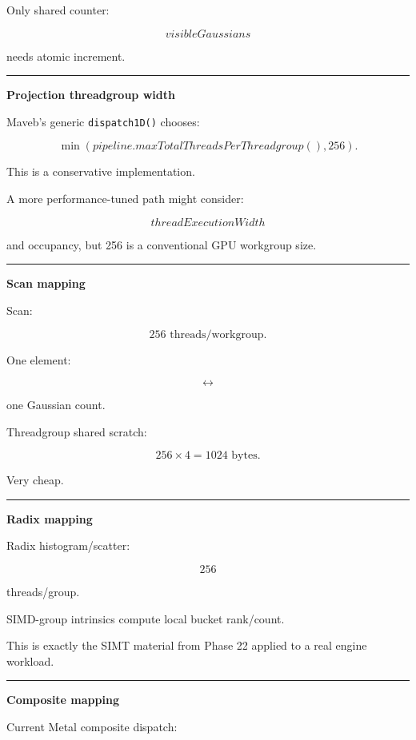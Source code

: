 Only shared counter:

\[
visibleGaussians
\]

needs atomic increment.

\begin{center}\rule{0.5\linewidth}{0.5pt}\end{center}

\textbf{Projection threadgroup width}

Maveb's generic \texttt{dispatch1D()} chooses:

\[
\min(
pipeline.maxTotalThreadsPerThreadgroup(),
256
).
\]

This is a conservative implementation.

A more performance-tuned path might consider:

\[
threadExecutionWidth
\]

and occupancy, but 256 is a conventional GPU workgroup size.

\begin{center}\rule{0.5\linewidth}{0.5pt}\end{center}

\textbf{Scan mapping}

Scan:

\[
256\text{ threads/workgroup}.
\]

One element:

\[
\leftrightarrow
\]

one Gaussian count.

Threadgroup shared scratch:

\[
256\times4
=
1024\text{ bytes}.
\]

Very cheap.

\begin{center}\rule{0.5\linewidth}{0.5pt}\end{center}

\textbf{Radix mapping}

Radix histogram/scatter:

\[
256
\]

threads/group.

SIMD-group intrinsics compute local bucket rank/count.

This is exactly the SIMT material from Phase 22 applied to a real engine workload.

\begin{center}\rule{0.5\linewidth}{0.5pt}\end{center}

\textbf{Composite mapping}

Current Metal composite dispatch:

